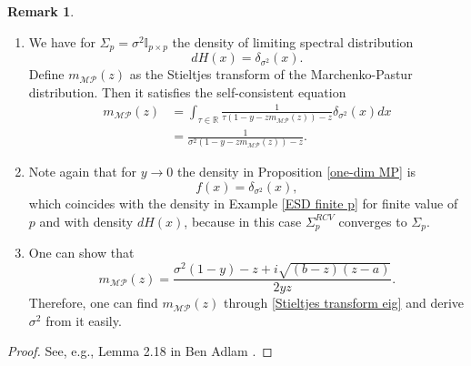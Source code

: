 \documentclass[a4paper,11pt]{book}
\theoremstyle{plain}
\theoremstyle{definition}
\newtheorem{rmrk}[thm]{Remark}
\newcommand{\MR}{\mathbb{R}}
\begin{document}
	\begin{rmrk} \
		\begin{enumerate}
			\item We have for $\Sigma_p = \sigma^2 \mathbb{I}_{p \times p}$ the density of limiting spectral distribution
			\[ dH(x) = \delta_{\sigma^2}(x). \]
			Define $m_{\mathcal{MP}}(z)$ as the Stieltjes transform of the Marchenko-Pastur distribution. Then it satisfies the self-consistent equation
			\[
			\begin{aligned}
			m_{\mathcal{MP}}(z) & = \int_{\tau \in \MR} \frac{1}{ \tau( 1-y-zm_{\mathcal{MP}}(z))-z} \delta_{\sigma^2}(x) dx \\
			& =  \frac{1}{ \sigma^2( 1-y-zm_{\mathcal{MP}}(z))-z}.
			\end{aligned}
			\]
			\item Note again that for $y \rightarrow 0$ the density in Proposition \ref{one-dim MP} is
			\[f(x) = \delta_{\sigma^2}(x), \]
			which coincides with the density in Example \ref{ESD finite p} for finite value of $p$ and with density $dH(x)$, because in this case $\Sigma_p^{RCV}$ converges to $\Sigma_p$.
			\item One can show that
			\[ m_{\mathcal{MP}}(z) = \frac{\sigma^2(1-y)-z+ i \sqrt{(b-z)(z-a)}}{2yz}. \]
			Therefore, one can find $m_{\mathcal{MP}}(z)$ through \eqref{Stieltjes transform eig} and derive $\sigma^2$ from it easily.
		\end{enumerate}
		\begin{proof}
			See, e.g., Lemma 2.18 in Ben Adlam \cite{Adlam}. 
		\end{proof}
	\end{rmrk}
	
\end{document}
